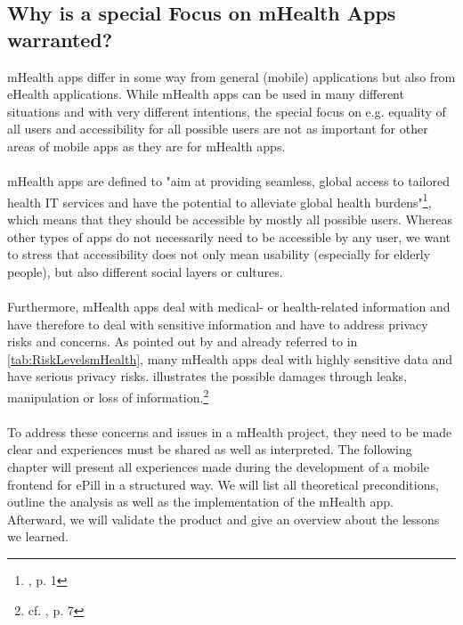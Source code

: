 \subsection{Why is a special Focus on mHealth Apps warranted?}
mHealth apps differ in some way from general (mobile) applications but also from eHealth applications. While mHealth apps can be used in many different situations and with very different intentions, the special focus on e.g. equality of all users and accessibility for all possible users are not as important for other areas of mobile apps as they are for mHealth apps. 
\\
\\
mHealth apps are defined to "aim at providing seamless, global access to tailored health IT services and have the potential to alleviate global health burdens"\footnote{\cite{Dehling.2013}, p. 1}, which means that they should be accessible by mostly all possible users. Whereas other types of apps do not necessarily need to be accessible by any user, we want to stress that accessibility does not only mean usability (especially for elderly people), but also different social layers or cultures.
\\
\\
Furthermore, mHealth apps deal with medical- or health-related information and have therefore to deal with sensitive information and have to address privacy risks and concerns. As pointed out by \cite{Njie.2013} and already referred to in \ref{tab:RiskLevelsmHealth}, many mHealth apps deal with highly sensitive data and have serious privacy risks. \cite{Dehling.2013} illustrates the possible damages through leaks, manipulation or loss of information.\footnote{cf. \cite{Dehling.2013}, p. 7}
\\
\\
To address these concerns and issues in a mHealth project, they need to be made clear and experiences must be shared as well as interpreted. The following chapter will present all experiences made during the development of a mobile frontend for ePill in a structured way. We will list all theoretical preconditions, outline the analysis as well as the implementation of the mHealth app. Afterward, we will validate the product and give an overview about the lessons we learned.